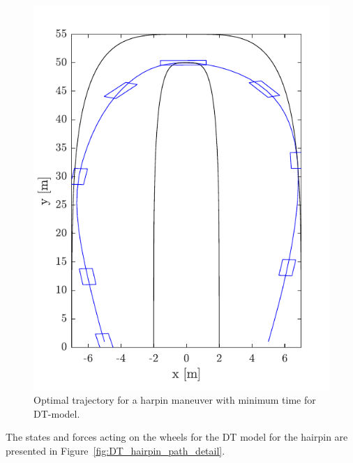 \begin{figure}[h!]
    \centering
    \includegraphics{figures/prob2_DT_path.pdf}
    \caption{Optimal trajectory for a harpin maneuver with minimum time for DT-model.}
    \label{fig:DT_hairpin_path}
\end{figure}

The states and forces acting on the wheels for the DT model for the hairpin are presented in Figure~\ref{fig:DT_hairpin_path_detail}. 

